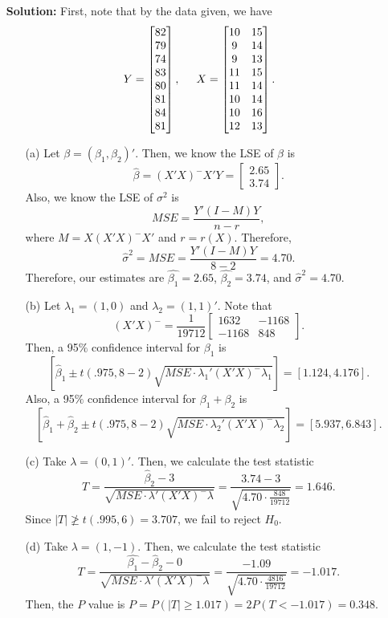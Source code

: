 \documentclass[11pt]{article}
\begin{document}
\begin{itemize}
\item[] {\bf Solution:}  First, note that by the data given, we have
\[
Y = \begin{bmatrix}
82 \\ 79 \\ 74 \\ 83 \\ 80 \\ 81 \\ 84 \\ 81
\end{bmatrix},\hspace{5mm} X = \begin{bmatrix}
10 & 15 \\
9 & 14 \\
9 & 13 \\
11 & 15 \\
11 & 14 \\
10 & 14 \\
10 & 16 \\
12 & 13 
\end{bmatrix}.
\]
\begin{itemize}
\item[(a)] Let $\beta = (\beta_1,\beta_2)'$.  Then, we know the LSE of $\beta$ is
\[
\widehat{\beta} = (X'X)^-X'Y = \begin{bmatrix}
2.65 \\ 3.74
\end{bmatrix}.
\]
Also, we know the LSE of $\sigma^2$ is
\[
MSE = \frac{Y'(I-M)Y}{n-r},
\]
where $M = X(X'X)^-X'$ and $r = r(X)$.  Therefore,
\[
\widehat{\sigma}^2 = MSE = \frac{Y'(I-M)Y}{8-2} = 4.70.
\]
Therefore, our estimates are $\widehat{\beta_1} = 2.65$, $\widehat{\beta_2} = 3.74$, and $\widehat{\sigma}^2 = 4.70$.
\item[(b)] Let $\lambda_1 = (1,0)$ and $\lambda_2 = (1,1)'$.  Note that
\[
(X'X)^- = \frac{1}{19712}\begin{bmatrix}
1632 & -1168 \\
-1168 & 848
\end{bmatrix}.
\]
Then, a 95$\%$ confidence interval for $\beta_1$ is
\[
\left[\widehat{\beta}_1 \pm t(.975,8-2)\sqrt{MSE\cdot\lambda_1'(X'X)^-\lambda_1} \right] = \left[1.124,4.176\right].
\]
Also, a 95$\%$ confidence interval for $\beta_1 + \beta_2$ is
\[
\left[\widehat{\beta}_1+\widehat{\beta}_2 \pm t(.975,8-2)\sqrt{MSE\cdot\lambda_2'(X'X)^-\lambda_2} \right] = \left[5.937,6.843\right].
\]
\item[(c)]  Take $\lambda = (0,1)'$.  Then, we calculate the test statistic
\[
T = \frac{\widehat{\beta}_2 - 3}{\sqrt{MSE\cdot\lambda'(X'X)^-\lambda}} = \frac{3.74 - 3}{\sqrt{4.70\cdot \frac{848}{19712}}} = 1.646.
\]
Since $|T| \not\geq t(.995,6) = 3.707$, we fail to reject $H_0$.
\item[(d)]  Take $\lambda = (1,-1)$.  Then, we calculate the test statistic
\[
T = \frac{\widehat{\beta_1}-\widehat{\beta}_2 - 0}{\sqrt{MSE\cdot \lambda'(X'X)^-\lambda}} = \frac{-1.09}{\sqrt{4.70\cdot \frac{4816}{19712}}} = -1.017.
\]
Then, the $P$ value is $P = P(|T| \geq 1.017) = 2P(T<-1.017) = 0.348$.
\end{itemize}
\end{itemize}
\end{document}
